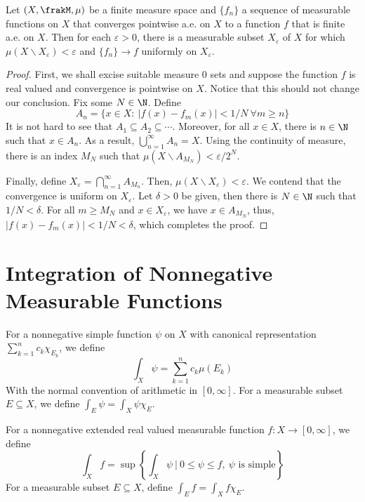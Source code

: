 \begin{theorem}[Egoroff]
    Let $(X,\frakM,\mu)$ be a finite measure space and $\{f_n\}$ a sequence of measurable functions on $X$ that converges pointwise a.e. on $X$ to a function $f$ that is finite a.e. on $X$. Then for each $\varepsilon > 0$, there is a measurable subset $X_\varepsilon$ of $X$ for which $\mu(X\backslash X_\varepsilon) < \varepsilon$ and $\{f_n\}\to f$ uniformly on $X_\varepsilon$.
\end{theorem}
\begin{proof}
    First, we shall excise suitable measure 0 sets and suppose the function $f$ is real valued and convergence is pointwise on $X$. Notice that this should not change our conclusion. Fix some $N\in\N$. Define 
    \begin{equation*}
        A_n = \{x\in X:~ |f(x) - f_m(x)| < 1/N~\forall m\ge n\}
    \end{equation*}
    It is not hard to see that $A_1\subseteq A_2\subseteq\cdots$. Moreover, for all $x\in X$, there is $n\in\N$ such that $x\in A_n$. As a result, $\bigcup\limits_{n = 1}^\infty A_n = X$. Using the continuity of measure, there is an index $M_N$ such that $\mu(X\backslash A_{M_N}) < \varepsilon/2^{N}$.

    Finally, define $X_\varepsilon = \bigcap_{n = 1}^\infty A_{M_n}$. Then, $\mu(X\backslash X_\varepsilon) < \varepsilon$. We contend that the convergence is uniform on $X_\varepsilon$. Let $\delta > 0$ be given, then there is $N\in\N$ such that $1/N < \delta$. For all $m\ge M_{N}$ and $x\in X_\varepsilon$, we have $x\in A_{M_N}$, thus, $|f(x) - f_m(x)| < 1/N < \delta$, which completes the proof.
\end{proof}

\section{Integration of Nonnegative Measurable Functions}

For a nonnegative simple function $\psi$ on $X$ with canonical representation $\sum_{k = 1}^n c_k\chi_{E_k}$, we define 
\begin{equation*}
    \int_X\psi = \sum_{k = 1}^n c_k\mu(E_k)
\end{equation*}
With the normal convention of arithmetic in $[0,\infty]$. For a measurable subset $E\subseteq X$, we define $\int_E\psi = \int_X\psi\chi_E$.

For a nonnegative extended real valued measurable function $f: X\to[0,\infty]$, we define 
\begin{equation*}
    \int_X f = \sup\left\{\int_X\psi~\bigg\vert~0\le\psi\le f,~\psi\text{ is simple}\right\}
\end{equation*}
For a measurable subset $E\subseteq X$, define $\int_E f = \int_X f\chi_E$.

